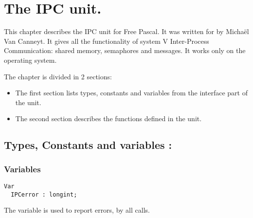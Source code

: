 %
%
%
%
%
\chapter{The IPC unit.}
This chapter describes the IPC unit for Free Pascal. It was written for
\linux by Micha\"el Van Canneyt. It gives all the functionality of system V 
Inter-Process Communication: shared memory, semaphores and messages.
It works only on the \linux operating system.

The chapter is divided in 2 sections:
\begin{itemize}
\item The first section lists types, constants and variables from the
interface part of the unit.
\item The second section describes the functions defined in the unit.
\end{itemize}
\section {Types, Constants and variables : }
\subsection{Variables}

\begin{verbatim}
Var
  IPCerror : longint;
\end{verbatim}
The  variable is used to report errors, by all calls.
